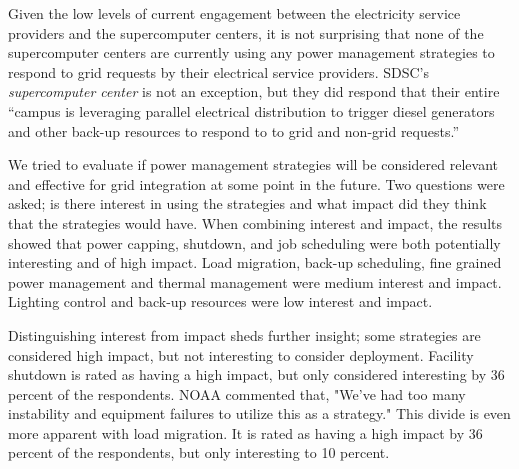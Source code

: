 Given the low levels of current engagement between the electricity service
providers and the supercomputer centers, it is not surprising that none of
the supercomputer centers are currently using any power management
strategies to respond to grid requests by their electrical service
providers. SDSC's \textit{supercomputer center} is not an exception, but they did respond that their
entire ``campus is leveraging parallel electrical distribution to trigger
diesel generators and other back-up resources to respond to to grid and
non-grid requests.''

We tried to evaluate if power management strategies will be considered
relevant and effective for grid integration at some point in the future. Two
questions were asked; is there interest in using the strategies and what
impact did they think that the strategies would have. When combining
interest and impact, the results showed that power capping, shutdown, and
job scheduling were both potentially interesting and of high impact. Load migration, back-up
scheduling, fine grained power management and thermal management were medium
interest and impact. Lighting control and back-up resources were low
interest and impact.  

Distinguishing interest from impact sheds further insight; some strategies are 
considered high impact, but not interesting to consider deployment.  Facility
shutdown is rated as having a high impact, but only
considered interesting by 36 percent of the respondents.  NOAA commented that, 
"We've had too many instability and equipment failures to utilize this as a strategy."  This divide is even more
apparent with load migration.  It is rated as having a high impact by 36 percent of the
respondents, but only interesting to 10 percent.  


